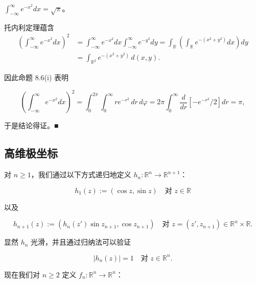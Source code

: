 \begin{example}

$ \displaystyle\int_{-\infty}^{\infty} e^{-x^{2}} dx = \sqrt{\pi} $。

\proofhead
托内利定理蕴含
\begin{equation*}
\begin{aligned}
\left(\int_{-\infty}^{\infty} e^{-x^{2}} dx\right)^{2} &= \int_{-\infty}^{\infty} e^{-x^{2}} dx \int_{-\infty}^{\infty} e^{-y^{2}} dy = \int_{\mathbb{R}} \left(\int_{\mathbb{R}} e^{-(x^{2}+y^{2})} dx\right) dy \\ &= \int_{\mathbb{R}^{2}} e^{-(x^{2}+y^{2})} \, d(x, y) .
\end{aligned}
\end{equation*}

因此命题 8.6(i) 表明

\[
\left(\int_{-\infty}^{\infty} e^{-x^{2}} dx\right)^{2} = \int_{0}^{2\pi} \int_{0}^{\infty} r e^{-r^{2}} \, dr \, d\varphi = 2\pi \int_{0}^{\infty} \frac{d}{dr}\left[-e^{-r^{2}}/2\right] dr = \pi ,
\]

于是结论得证。\nobreak\hspace{0.35em}■

\end{example}

\subsection*{高维极坐标}

对 $ n \ge 1 $，我们通过以下方式递归地定义 $ h_{n} : \mathbb{R}^{n} \to \mathbb{R}^{n+1} $：

\begin{equation}
h_{1}(z) := (\cos z, \sin z) \quad \text{对 } z \in \mathbb{R}\tag{8.11}
\end{equation}

以及

\begin{equation}
h_{n+1}(z) := (h_{n}(z') \sin z_{n+1}, \cos z_{n+1}) \quad \text{对 } z = (z', z_{n+1}) \in \mathbb{R}^{n} \times \mathbb{R} .\tag{8.12}
\end{equation}

显然 $ h_{n} $ 光滑，并且通过归纳法可以验证

\begin{equation}
|h_{n}(z)| = 1 \quad \text{对 } z \in \mathbb{R}^{n} .\tag{8.13}
\end{equation}

现在我们对 $ n \ge 2 $ 定义 $ f_{n} : \mathbb{R}^{n} \to \mathbb{R}^{n} $：

